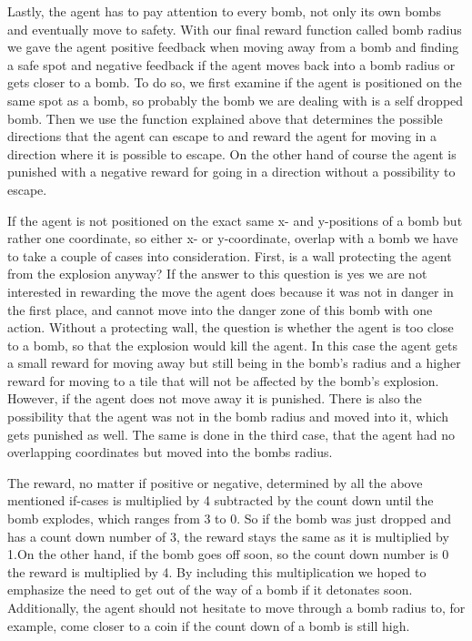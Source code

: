 Lastly, the agent has to pay attention to every bomb, not only its own bombs and eventually move to safety. With our final reward function called bomb radius we gave the agent positive feedback when moving away from a bomb and finding a safe spot and negative feedback if the agent moves back into a bomb radius or gets closer to a bomb. To do so, we first examine if the agent is positioned on the same spot as a bomb, so probably the bomb we are dealing with is a self dropped bomb. Then we use the function explained above that determines the possible directions that the agent can escape to and reward the agent for moving in a direction where it is possible to escape. On the other hand of course the agent is punished with a negative reward for going in a direction without a possibility to escape. 

If the agent is not positioned on the exact same x- and y-positions of a bomb but rather one coordinate, so either x- or y-coordinate, overlap with a bomb we have to take a couple of cases into consideration. First, is a wall protecting the agent from the explosion anyway? If the answer to this question is yes we are not interested in rewarding the move the agent does because it was not in danger in the first place, and cannot move into the danger zone of this bomb with one action. Without a protecting wall, the question is whether the agent is too close to a bomb, so that the explosion would kill the agent. In this case the agent gets a small reward for moving away but still being in the bomb's radius and a higher reward for moving to a tile that will not be affected by the bomb's explosion. However, if the agent does not move away it is punished. There is also the possibility that the agent was not in the bomb radius and moved into it, which gets punished as well. The same is done in the third case, that the agent had no overlapping coordinates but moved into the bombs radius.

The reward, no matter if positive or negative, determined by all the above mentioned if-cases is multiplied by 4 subtracted by the count down until the bomb explodes, which ranges from 3 to 0. So if the bomb was just dropped and has a count down number of 3, the reward stays the same as it is multiplied by 1.On the other hand, if the bomb goes off soon, so the count down number is 0 the reward is multiplied by 4. By including this multiplication we hoped to emphasize the need to get out of the way of a bomb if it detonates soon. Additionally, the agent should not hesitate to move through a bomb radius to, for example, come closer to a coin if the count down of a bomb is still high.
\\ 

